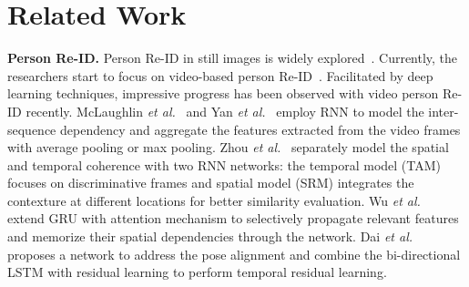 \documentclass[journal]{IEEEtran}
\newcommand{\etal}{\textit{et al.}}
\begin{document}
\section{Related Work}\label{sec:related work}
\textbf{Person Re-ID.}
Person Re-ID in still images is widely explored~\cite{Zhao_2017_ICCV,Sun_2018_ECCV,Fuyang_2019_AAAI,Zheng_2019_CVPR,Zhou_2019_ICCV,Yu_2018_ECCV,Zhou_2017_ICCV,Xiao_2017_CVPR,Saquib_2018_CVPR,Qian_2018_ECCV,Su_2017_ICCV}. Currently, the researchers start to focus on video-based person Re-ID~\cite{McLaughlin_2016_CVPR,Yan_2016_ECCV}. Facilitated by deep learning techniques, impressive progress has been observed with video person Re-ID recently. McLaughlin \etal~\cite{McLaughlin_2016_CVPR} and Yan \etal~\cite{Yan_2016_ECCV} employ RNN to model the inter-sequence dependency and aggregate the features extracted from the video frames with average pooling or max pooling. Zhou \etal~\cite{Zhou_2017_CVPR} separately model the spatial and temporal coherence with two RNN networks: the temporal model (TAM) focuses on discriminative frames and spatial model (SRM) integrates the contexture at different locations for better similarity evaluation. Wu \etal~\cite{Wu_2018_TMM} extend GRU with attention mechanism to selectively propagate relevant features and memorize their spatial dependencies through the network. Dai \etal~\cite{Dai_2018_TIP} proposes a  network to address the pose alignment and combine the bi-directional LSTM with residual learning to perform temporal residual learning.
\end{document}
